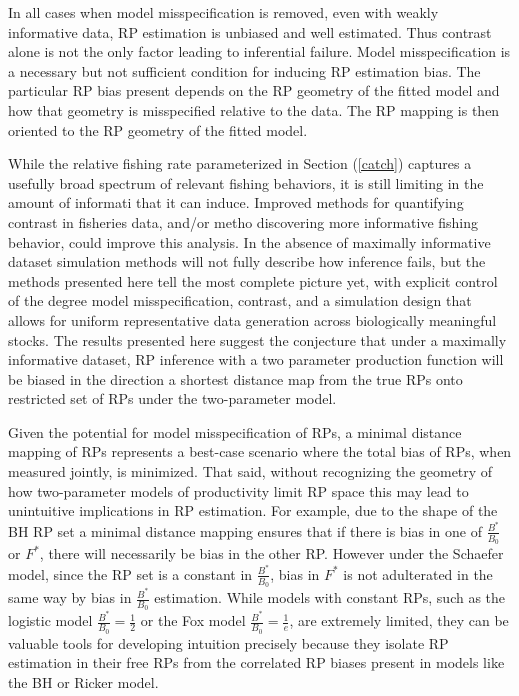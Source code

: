 {%
In all cases when model misspecification is removed, even with weakly informative
data, RP estimation is unbiased and well estimated. Thus contrast alone is
not the only factor leading to inferential failure. Model misspecification is a
necessary but not sufficient condition for inducing RP estimation bias. The
particular RP bias present depends on the RP geometry of the fitted model and
how that geometry is misspecified relative to the data. The RP mapping is then oriented
to the RP geometry of the fitted model.

%
While the relative fishing rate parameterized in Section (\ref{catch}) captures a usefully
broad spectrum of relevant fishing behaviors, it is still limiting in the amount of informati
that it can induce. Improved methods for quantifying contrast in fisheries data, and/or metho
discovering more informative fishing behavior, could improve this analysis. In the absence of
maximally informative dataset simulation methods will not fully describe how
inference fails, but the methods presented here tell the most complete picture
yet, with explicit control of the degree model misspecification, contrast, and
a simulation design that allows for uniform representative data generation
across biologically meaningful stocks. The results presented here suggest the
conjecture that under a maximally informative dataset, RP inference with a two
parameter production function will be biased in the direction a shortest distance
map from the true RPs onto restricted set of RPs under the two-parameter model.

%
Given the potential for model misspecification of RPs, a minimal distance
mapping of RPs represents a best-case scenario where the total bias of RPs,
when measured jointly, is minimized. That said, without recognizing the
geometry of how two-parameter models of productivity limit RP space this may
lead to unintuitive implications in RP estimation. For example, due to the
shape of the BH RP set a minimal distance mapping ensures that if there is
bias in one of $\frac{B^*}{B_0}$ or $F^*$, there will necessarily be
bias in the other RP. However under the Schaefer model, since the RP set is a
constant in $\frac{B^*}{B_0}$, bias in $F^*$ is not adulterated in the
same way by bias in $\frac{B^*}{B_0}$ estimation. While models with
constant RPs, such as the logistic model $\frac{B^*}{B_0}=\frac{1}{2}$ or
the Fox model $\frac{B^*}{B_0}=\frac{1}{e}$, are extremely limited, they
can be valuable tools for developing intuition precisely because they isolate
RP estimation in their free RPs from the correlated RP biases present in
models like the BH or Ricker model.

}
